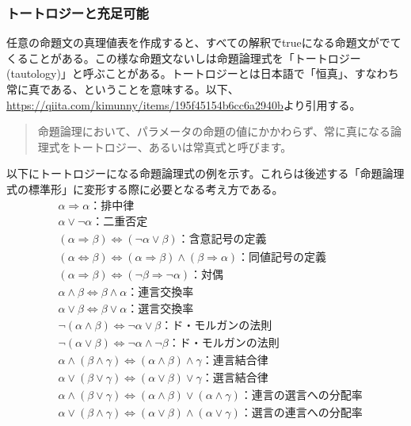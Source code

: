 \documentclass[dvipdfmx]{jsarticle}
\begin{document}
\subsubsection{トートロジーと充足可能}
任意の命題文の真理値表を作成すると、すべての解釈でtrueになる命題文がでてくることがある。この様な命題文ないしは命題論理式を「トートロジー(tautology)」と呼ぶことがある。トートロジーとは日本語で「恒真」、すなわち常に真である、ということを意味する。以下、\url{https://qiita.com/kimunny/items/195f45154b6cc6a2940b}より引用する。
\begin{quote}
  命題論理において、パラメータの命題の値にかかわらず、常に真になる論理式をトートロジー、あるいは常真式と呼びます。
\end{quote}
以下にトートロジーになる命題論理式の例を示す。これらは後述する「命題論理式の標準形」に変形する際に必要となる考え方である。
\begin{align*}
  &\alpha \Rightarrow \alpha ：排中律\\
  &\alpha \vee \neg \alpha ：二重否定\\
  &(\alpha \Rightarrow \beta) \Leftrightarrow (\neg \alpha \vee \beta)：含意記号の定義 \\
  &(\alpha \Leftrightarrow \beta) \Leftrightarrow (\alpha \Rightarrow \beta) \wedge (\beta \Rightarrow \alpha)：同値記号の定義\\
  &(\alpha \Rightarrow \beta) \Leftrightarrow (\neg \beta \Rightarrow \neg \alpha)：対偶 \\
  &\alpha \wedge \beta \Leftrightarrow \beta \wedge \alpha：連言交換率 \\
  &\alpha \vee \beta \Leftrightarrow \beta \vee \alpha：選言交換率\\
  &\neg(\alpha \wedge \beta) \Leftrightarrow \neg \alpha \vee \beta：ド・モルガンの法則 \\
  &\neg(\alpha \vee \beta) \Leftrightarrow \neg \alpha \wedge \neg \beta：ド・モルガンの法則\\
  &\alpha \wedge (\beta \wedge \gamma) \Leftrightarrow (\alpha \wedge \beta) \wedge \gamma：連言結合律 \\
  &\alpha \vee (\beta \vee \gamma) \Leftrightarrow (\alpha \vee \beta) \vee \gamma：選言結合律 \\
  &\alpha \wedge (\beta \vee \gamma) \Leftrightarrow (\alpha \wedge \beta) \vee (\alpha \wedge \gamma)：連言の選言への分配率 \\
  &\alpha \vee (\beta \wedge \gamma) \Leftrightarrow (\alpha \vee \beta) \wedge (\alpha \vee \gamma)：選言の連言への分配率
\end{align*}
\end{document}
